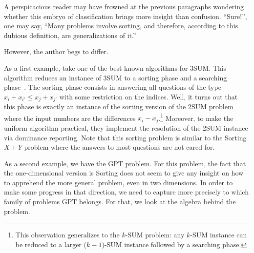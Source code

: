 A perspicacious reader may have frowned at the previous paragraphs wondering
whether this embryo of classification brings more insight than confusion.
``Sure!'', one may say, ``Many problems involve sorting, and therefore,
according to this dubious definition, are generalizations of it.''

However, the author begs to differ.

As a first example, take one of the best known algorithms for 3SUM. This
algorithm reduces an instance of 3SUM to a sorting phase and a searching
phase~\cite{GP18}. The sorting phase consists in answering all questions of the type
\( x_i + x_{i'} \le x_j + x_{j'} \) with some restriction on the indices.
Well, it
turns out that this phase is exactly an instance of
the sorting version of the 2SUM problem where the input numbers are the
differences \(x_i - x_j\).\footnote{This observation generalizes to the \(k\)-SUM
problem: any \(k\)-SUM instance can be reduced to a larger (\(k-1\))-SUM instance
followed by a searching phase.} Moreover, to make the uniform algorithm
practical, they implement the resolution of the 2SUM instance via dominance
reporting.
Note that this sorting problem is similar to the Sorting \(X+Y\) problem where
the answers to most questions are not cared for.

As a second example, we have the GPT problem. For this problem, the fact that
the one-dimensional version is Sorting does not seem to give any insight on how
to apprehend the more general problem, even in two dimensions. In order to make
some progress in that direction, we need to capture more precisely to which
family of problems GPT belongs. For that, we look at the algebra behind the
problem.


